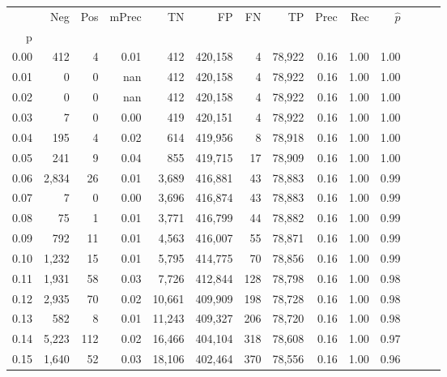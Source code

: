 \begin{tabular}{rrrrrrrrrrrrrr}
\toprule
{} &     Neg &    Pos & mPrec &       TN &       FP &      FN &      TP &  Prec &   Rec & $\hat{p}$ \\
p    &         &        &       &          &          &         &         &       &       &           \\
\midrule
0.00 &     412 &      4 &  0.01 &      412 &  420,158 &       4 &  78,922 &  0.16 &  1.00 &      1.00 \\
0.01 &       0 &      0 &   nan &      412 &  420,158 &       4 &  78,922 &  0.16 &  1.00 &      1.00 \\
0.02 &       0 &      0 &   nan &      412 &  420,158 &       4 &  78,922 &  0.16 &  1.00 &      1.00 \\
0.03 &       7 &      0 &  0.00 &      419 &  420,151 &       4 &  78,922 &  0.16 &  1.00 &      1.00 \\
0.04 &     195 &      4 &  0.02 &      614 &  419,956 &       8 &  78,918 &  0.16 &  1.00 &      1.00 \\
0.05 &     241 &      9 &  0.04 &      855 &  419,715 &      17 &  78,909 &  0.16 &  1.00 &      1.00 \\
0.06 &   2,834 &     26 &  0.01 &    3,689 &  416,881 &      43 &  78,883 &  0.16 &  1.00 &      0.99 \\
0.07 &       7 &      0 &  0.00 &    3,696 &  416,874 &      43 &  78,883 &  0.16 &  1.00 &      0.99 \\
0.08 &      75 &      1 &  0.01 &    3,771 &  416,799 &      44 &  78,882 &  0.16 &  1.00 &      0.99 \\
0.09 &     792 &     11 &  0.01 &    4,563 &  416,007 &      55 &  78,871 &  0.16 &  1.00 &      0.99 \\
0.10 &   1,232 &     15 &  0.01 &    5,795 &  414,775 &      70 &  78,856 &  0.16 &  1.00 &      0.99 \\
0.11 &   1,931 &     58 &  0.03 &    7,726 &  412,844 &     128 &  78,798 &  0.16 &  1.00 &      0.98 \\
0.12 &   2,935 &     70 &  0.02 &   10,661 &  409,909 &     198 &  78,728 &  0.16 &  1.00 &      0.98 \\
0.13 &     582 &      8 &  0.01 &   11,243 &  409,327 &     206 &  78,720 &  0.16 &  1.00 &      0.98 \\
0.14 &   5,223 &    112 &  0.02 &   16,466 &  404,104 &     318 &  78,608 &  0.16 &  1.00 &      0.97 \\
0.15 &   1,640 &     52 &  0.03 &   18,106 &  402,464 &     370 &  78,556 &  0.16 &  1.00 &      0.96 \\

\end{tabular}
